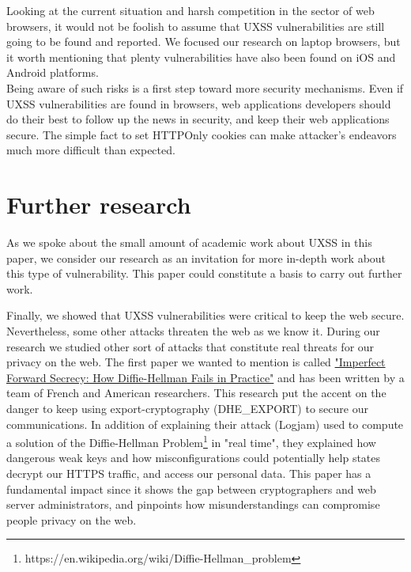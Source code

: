 \documentclass[journal]{IEEEtran}
\begin{document}
\medskip

Looking at the current situation and harsh competition in the sector of web browsers, it would not be foolish to assume that UXSS vulnerabilities are still going to be found and reported. We focused our research on laptop browsers, but it worth mentioning that plenty vulnerabilities have also been found on iOS and Android platforms. \\
Being aware of such risks is a first step toward more security mechanisms. Even if UXSS vulnerabilities are found in browsers, web applications developers should do their best to follow up the news in security, and keep their web applications secure. The simple fact to set HTTPOnly cookies can make attacker's endeavors much more difficult than expected.


\section{Further research}

As we spoke about the small amount of academic work about UXSS in this paper, we consider our research as an invitation for more in-depth work about this type of vulnerability. This paper could constitute a basis to carry out further work.

\medskip

Finally, we showed that UXSS vulnerabilities were critical to keep the web secure. Nevertheless, some other attacks threaten the web as we know it. During our research we studied other sort of attacks that constitute real threats for our privacy on the web. The first paper we wanted to mention is called \ul{"Imperfect Forward Secrecy: How Diffie-Hellman Fails in Practice"} and has been written by a team of French and American researchers. This research put the accent on the danger to keep using export-cryptography (DHE\_EXPORT) to secure our communications. In addition of explaining their attack (Logjam) used to compute a solution of the Diffie-Hellman Problem\footnote{https://en.wikipedia.org/wiki/Diffie-Hellman\_problem} in "real time", they explained how dangerous weak keys and how misconfigurations could potentially help states decrypt our HTTPS traffic, and access our personal data. This paper has a fundamental impact since it shows the gap between cryptographers and web server administrators, and pinpoints how misunderstandings can compromise people privacy on the web.

\medskip
\end{document}

